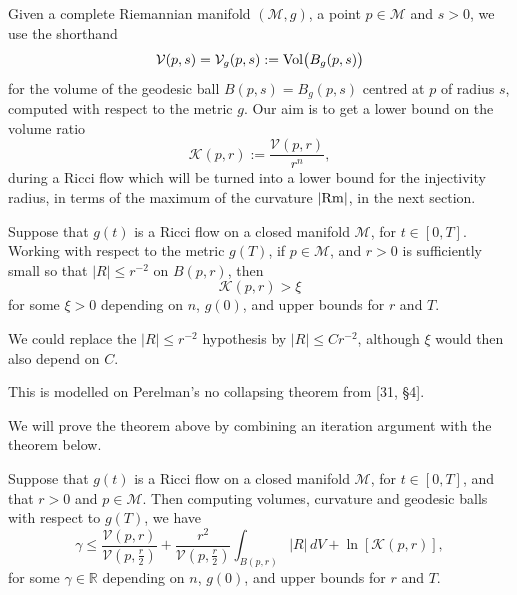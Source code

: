 Given a complete Riemannian manifold $(\mathcal M,g)$, a point $p\in\mathcal M$
and $s>0$, we use the shorthand
\[
\mathcal V(p,s)=\mathcal V_g(p,s):=\operatorname{Vol}\bigl(B_g(p,s)\bigr)
\]
for the volume of the geodesic ball $B(p,s)=B_g(p,s)$ centred at $p$ of
radius $s$, computed with respect to the metric $g$. Our aim is to get a lower
bound on the volume ratio
\[
\mathcal K(p,r):=\frac{\mathcal V(p,r)}{r^n},
\]
during a Ricci flow which will be turned into a lower bound for the injectivity
radius, in terms of the maximum of the curvature $|{\rm Rm}|$, in the next
section.

\begin{theorem}
\label{topping-ch8-no-collapsing}
Suppose that $g(t)$ is a Ricci flow on a closed manifold $\mathcal M$, for
$t \in [0,T]$. Working with respect to the metric $g(T)$, if $p \in \mathcal M$,
and $r > 0$ is sufficiently small so that $|R| \le r^{-2}$ on $B(p,r)$, then
\[
\mathcal K(p,r) > \xi
\]
for some $\xi > 0$ depending on $n$, $g(0)$, and upper bounds for $r$ and $T$.
\end{theorem}

\begin{remark}
\label{topping-ch8-no-collapsing-variant}
We could replace the $|R| \le r^{-2}$ hypothesis by $|R| \le C r^{-2}$,
although $\xi$ would then also depend on $C$.
\end{remark}

\begin{remark}
\label{topping-ch8-no-collapsing-perelman}
This is modelled on Perelman's no collapsing theorem from [31, \S4].
\end{remark}

We will prove the theorem above by combining an iteration argument with the
theorem below.

\begin{theorem}
\label{topping-ch8-mu-ball-estimate}
Suppose that $g(t)$ is a Ricci flow on a closed manifold $\mathcal M$, for
$t \in [0,T]$, and that $r > 0$ and $p \in \mathcal M$. Then computing
volumes, curvature and geodesic balls with respect to $g(T)$, we have
\[
\gamma \le \frac{\mathcal V(p,r)}{\mathcal V(p,\frac r2)}
+ \frac{r^2}{\mathcal V(p,\frac r2)} \int_{B(p,r)} |R|\,dV + \ln[\mathcal K(p,r)],
\]
for some $\gamma \in \mathbb R$ depending on $n$, $g(0)$, and upper bounds for
$r$ and $T$.
\end{theorem}

